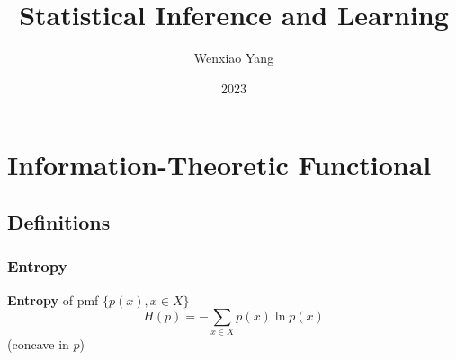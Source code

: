 \documentclass[11pt]{elegantbook}
\title{Statistical Inference and Learning}
\author{Wenxiao Yang}
\institute{Haas School of Business, University of California Berkeley}
\date{2023}
\begin{document}
\maketitle

\frontmatter
\tableofcontents

\mainmatter



\chapter{Information-Theoretic Functional}
\section{Definitions}
\subsection{Entropy}
\begin{definition}[Entropy]
    \textbf{Entropy} of pmf $\{p(x),x\in X\}$ $$H(p)=-\sum_{x\in X}p(x)\ln p(x)$$
    (concave in $p$)
\end{definition}
\end{document}
